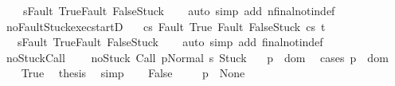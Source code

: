 \begin{isabellebody}
\ \ \ {\isasymLongrightarrow}\ s{\isasymnotin}{\isacharbraceleft}Fault\ True{\isacharcomma}Fault\ False{\isacharcomma}Stuck{\isacharbraceright}{\isachardoublequoteclose}\isanewline
%
\isadelimproof
\ \ %
\endisadelimproof
%
\isatagproof
{}\isamarkupfalse%
\ {\isacharparenleft}auto\ simp\ add{\isacharcolon}\ nfinal{\isacharunderscore}notin{\isacharunderscore}def\ {\isacharparenright}%
\endisatagproof
{\isafoldproof}%
%
\isadelimproof
\isanewline
%
\endisadelimproof
\isanewline
{}\isamarkupfalse%
\ noFaultStuck{\isacharunderscore}exec{\isacharunderscore}startD{\isacharcolon}\ \isanewline
\ \ {\isachardoublequoteopen}{\isasymlbrakk}{\isasymGamma}{\isasymturnstile}{\isasymlangle}c{\isacharcomma}s{\isasymrangle}\ {\isasymRightarrow}{\isasymnotin}{\isacharbraceleft}Fault\ True{\isacharcomma}\ Fault\ False{\isacharcomma}Stuck{\isacharbraceright}{\isacharsemicolon}\ {\isasymGamma}{\isasymturnstile}{\isasymlangle}c{\isacharcomma}s{\isasymrangle}\ {\isasymRightarrow}t{\isasymrbrakk}\ \isanewline
\ \ {\isasymLongrightarrow}\ s{\isasymnotin}{\isacharbraceleft}Fault\ True{\isacharcomma}Fault\ False{\isacharcomma}Stuck{\isacharbraceright}{\isachardoublequoteclose}\isanewline
%
\isadelimproof
\ \ %
\endisadelimproof
%
\isatagproof
{}\isamarkupfalse%
\ {\isacharparenleft}auto\ simp\ add{\isacharcolon}\ final{\isacharunderscore}notin{\isacharunderscore}def\ {\isacharparenright}%
\endisatagproof
{\isafoldproof}%
%
\isadelimproof
\isanewline
%
\endisadelimproof
\isanewline
{}\isamarkupfalse%
\ noStuck{\isacharunderscore}Call{\isacharcolon}\ \isanewline
\ \ \ noStuck{\isacharcolon}\ {\isachardoublequoteopen}{\isasymGamma}{\isasymturnstile}{\isasymlangle}Call\ p{\isacharcomma}Normal\ s{\isasymrangle}\ {\isasymRightarrow}{\isasymnotin}{\isacharbraceleft}Stuck{\isacharbraceright}{\isachardoublequoteclose}\isanewline
\ \ \ {\isachardoublequoteopen}p\ {\isasymin}\ dom\ {\isasymGamma}{\isachardoublequoteclose}\isanewline
%
\isadelimproof
%
\endisadelimproof
%
\isatagproof
{}\isamarkupfalse%
\ {\isacharparenleft}cases\ {\isachardoublequoteopen}p\ {\isasymin}\ dom\ {\isasymGamma}{\isachardoublequoteclose}{\isacharparenright}\isanewline
\ \ \isamarkupfalse%
\ True\ \isamarkupfalse%
\ {\isacharquery}thesis\ \isamarkupfalse%
\ simp\isanewline
{}\isamarkupfalse%
\isanewline
\ \ \isamarkupfalse%
\ False\isanewline
\ \ \isamarkupfalse%
\ {\isachardoublequoteopen}{\isasymGamma}\ p\ {\isacharequal}\ None{\isachardoublequoteclose}\ \isamarkupfalse%

\end{isabellebody}
